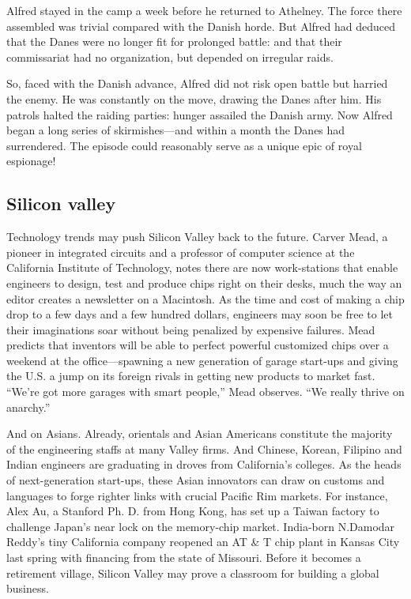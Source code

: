 \documentclass[11pt]{article}
\begin{document}
Alfred stayed in the camp a week before he returned to Athelney. The force there assembled was trivial compared with the Danish horde. But Alfred had deduced that the Danes were no longer fit for prolonged battle: and that their commissariat had no organization, but depended on irregular raids.

So, faced with the Danish advance, Alfred did not risk open battle but harried the enemy. He was constantly on the move, drawing the Danes after him. His patrols halted the raiding parties: hunger assailed the Danish army. Now Alfred began a long series of skirmishes---and within a month the Danes had surrendered. The episode could reasonably serve as a unique epic of royal espionage!
\subsection{Silicon valley}
\label{sec-2-10}

Technology trends may push Silicon Valley back to the future. Carver Mead, a pioneer in integrated circuits and a professor of computer science at the California Institute of Technology, notes there are now work-stations that enable engineers to design, test and produce chips right on their desks, much the way an editor creates a newsletter on a Macintosh. As the time and cost of making a chip drop to a few days and a few hundred dollars, engineers may soon be free to let their imaginations soar without being penalized by expensive failures. Mead predicts that inventors will be able to perfect powerful customized chips over a weekend at the office---spawning a new generation of garage start-ups and giving the U.S. a jump on its foreign rivals in getting new products to market fast. ``We're got more garages with smart people,'' Mead observes. ``We really thrive on anarchy.''

And on Asians. Already, orientals and Asian Americans constitute the majority of the engineering staffs at many Valley firms. And Chinese, Korean, Filipino and Indian engineers are graduating in droves from California's colleges. As the heads of next-generation start-ups, these Asian innovators can draw on customs and languages to forge righter links with crucial Pacific Rim markets. For instance, Alex Au, a Stanford Ph. D. from Hong Kong, has set up a Taiwan factory to challenge Japan's near lock on the memory-chip market. India-born N.Damodar Reddy's tiny California company reopened an AT \& T chip plant in Kansas City last spring with financing from the state of Missouri. Before it becomes a retirement village, Silicon Valley may prove a classroom for building a global business.
\end{document}
